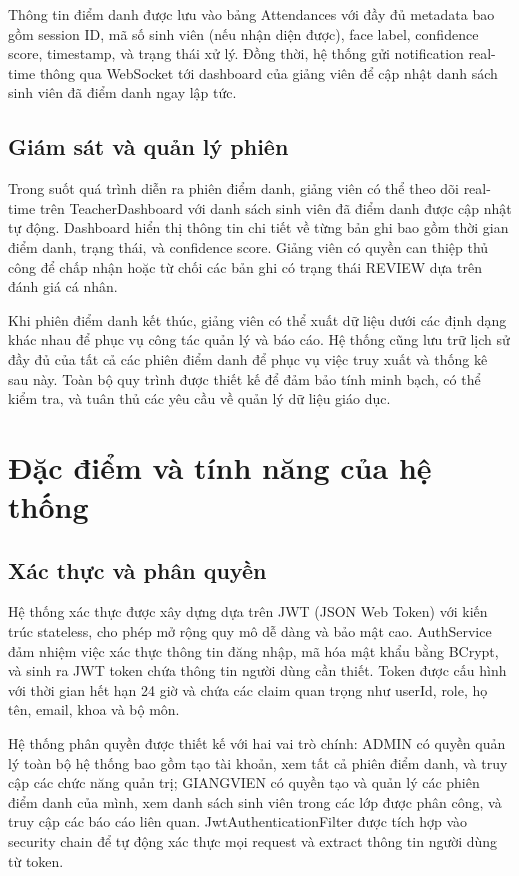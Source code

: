 \documentclass[12pt,a4paper]{report}
\begin{document}
Thông tin điểm danh được lưu vào bảng Attendances với đầy đủ metadata bao gồm session ID, mã số sinh viên (nếu nhận diện được), face label, confidence score, timestamp, và trạng thái xử lý. Đồng thời, hệ thống gửi notification real-time thông qua WebSocket tới dashboard của giảng viên để cập nhật danh sách sinh viên đã điểm danh ngay lập tức.

\subsection{Giám sát và quản lý phiên}
Trong suốt quá trình diễn ra phiên điểm danh, giảng viên có thể theo dõi real-time trên TeacherDashboard với danh sách sinh viên đã điểm danh được cập nhật tự động. Dashboard hiển thị thông tin chi tiết về từng bản ghi bao gồm thời gian điểm danh, trạng thái, và confidence score. Giảng viên có quyền can thiệp thủ công để chấp nhận hoặc từ chối các bản ghi có trạng thái REVIEW dựa trên đánh giá cá nhân.

Khi phiên điểm danh kết thúc, giảng viên có thể xuất dữ liệu dưới các định dạng khác nhau để phục vụ công tác quản lý và báo cáo. Hệ thống cũng lưu trữ lịch sử đầy đủ của tất cả các phiên điểm danh để phục vụ việc truy xuất và thống kê sau này. Toàn bộ quy trình được thiết kế để đảm bảo tính minh bạch, có thể kiểm tra, và tuân thủ các yêu cầu về quản lý dữ liệu giáo dục.

\section{Đặc điểm và tính năng của hệ thống}
\subsection{Xác thực và phân quyền}
Hệ thống xác thực được xây dựng dựa trên JWT (JSON Web Token) với kiến trúc stateless, cho phép mở rộng quy mô dễ dàng và bảo mật cao. AuthService đảm nhiệm việc xác thực thông tin đăng nhập, mã hóa mật khẩu bằng BCrypt, và sinh ra JWT token chứa thông tin người dùng cần thiết. Token được cấu hình với thời gian hết hạn 24 giờ và chứa các claim quan trọng như userId, role, họ tên, email, khoa và bộ môn.

Hệ thống phân quyền được thiết kế với hai vai trò chính: ADMIN có quyền quản lý toàn bộ hệ thống bao gồm tạo tài khoản, xem tất cả phiên điểm danh, và truy cập các chức năng quản trị; GIANGVIEN có quyền tạo và quản lý các phiên điểm danh của mình, xem danh sách sinh viên trong các lớp được phân công, và truy cập các báo cáo liên quan. JwtAuthenticationFilter được tích hợp vào security chain để tự động xác thực mọi request và extract thông tin người dùng từ token.
\end{document}
